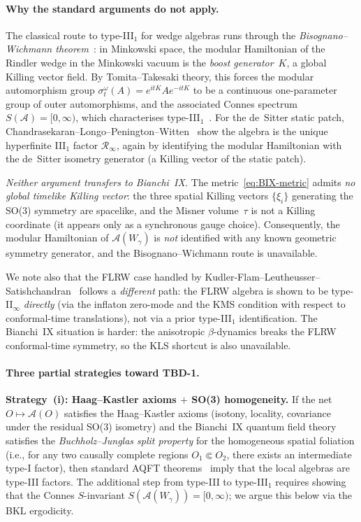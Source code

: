 \documentclass[12pt,a4paper]{article}
\begin{document}
\paragraph{Why the standard arguments do not apply.}
The classical route to type-III$_1$ for wedge algebras
runs through the \emph{Bisognano--Wichmann theorem}~\cite{BW76}:
in Minkowski space, the modular Hamiltonian of the Rindler wedge in the
Minkowski vacuum is the \emph{boost generator}~$K$, a global Killing
vector field.
By Tomita--Takesaki theory, this forces the modular automorphism
group $\sigma_t^{\omega}(A) = e^{itK}Ae^{-itK}$ to be a continuous
one-parameter group of outer automorphisms, and the associated Connes
spectrum $S(\mathcal{A}) = [0,\infty)$, which characterises
type-III$_1$~\cite{Witten2022}.
For the de~Sitter static patch,
Chandrasekaran--Longo--Penington--Witten~\cite{CLPW2022}
show the algebra is the unique hyperfinite III$_1$ factor
$\mathcal{R}_\infty$, again by identifying the
modular Hamiltonian with the de~Sitter isometry generator
(a Killing vector of the static patch).

\emph{Neither argument transfers to Bianchi~IX.}
The metric~\eqref{eq:BIX-metric} admits \emph{no global timelike Killing
vector}: the three spatial Killing vectors $\{\xi_i\}$ generating the
SO(3) symmetry are spacelike, and the Misner volume~$\tau$ is not a
Killing coordinate (it appears only as a synchronous gauge choice).
Consequently, the modular Hamiltonian of $\mathcal{A}(W_\gamma)$
is \emph{not} identified with any known geometric symmetry generator,
and the Bisognano--Wichmann route is unavailable.

We note also that the FLRW case handled by
Kudler-Flam--Leutheusser--Satishchandran~\cite{KLS2024}
follows a \emph{different} path: the FLRW algebra is shown to be
type-II$_\infty$ \emph{directly} (via the inflaton zero-mode and
the KMS condition with respect to conformal-time translations),
not via a prior type-III$_1$ identification.
The Bianchi~IX situation is harder: the anisotropic $\beta$-dynamics
breaks the FLRW conformal-time symmetry, so the KLS shortcut is also
unavailable.

\paragraph{Three partial strategies toward TBD-1.}

\vspace{4pt}
\noindent\textbf{Strategy~(i): Haag--Kastler axioms $+$ SO(3) homogeneity.}
If the net $O\mapsto\mathcal{A}(O)$ satisfies the Haag--Kastler
axioms (isotony, locality, covariance under the residual SO(3) isometry)
and the Bianchi~IX quantum field theory satisfies the
\emph{Buchholz--Junglas split property} for the homogeneous spatial foliation
(i.e., for any two causally complete regions $O_1\Subset O_2$,
there exists an intermediate type-I factor),
then standard AQFT theorems~\cite{Buchholz1986,BV1996} imply
that the local algebras are type-III factors.
The additional step from type-III to type-III$_1$ requires showing
that the Connes $S$-invariant $S(\mathcal{A}(W_\gamma))=[0,\infty)$;
we argue this below via the BKL ergodicity.
\end{document}
